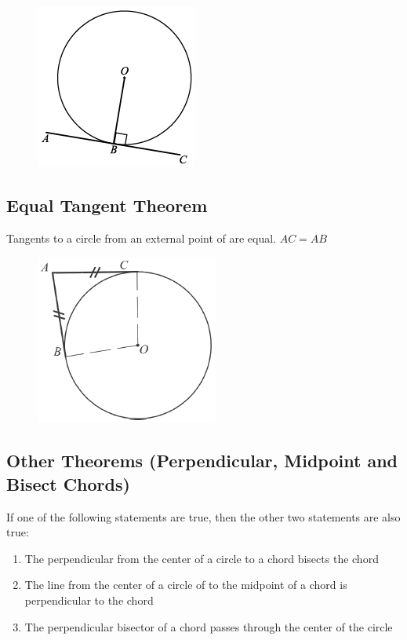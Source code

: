 \documentclass[12pt]{article}
\begin{document}
\begin{figure}[h!]
	\centering
	\includegraphics[height=0.15\textheight]{Graphics/Week_13/RightAngleTangent.png}
\end{figure}

\newpage

\subsection{Equal Tangent Theorem}
Tangents to a circle from an external point of are equal. $AC = AB$
	
\begin{figure}[h!]
	\centering
	\includegraphics[height=0.15\textheight]{Graphics/Week_13/EqualTangents.png}
\end{figure}

\subsection{Other Theorems (Perpendicular, Midpoint and Bisect Chords)}
If one of the following statements are true, then the other two statements are also true:
\begin{enumerate}
    \item The perpendicular from the center of a circle to a chord bisects the chord
    \item The line from the center of a circle of to the midpoint of a chord is perpendicular to the chord
    \item The perpendicular bisector of a chord passes through the center of the circle
\end{enumerate}
\end{document}
